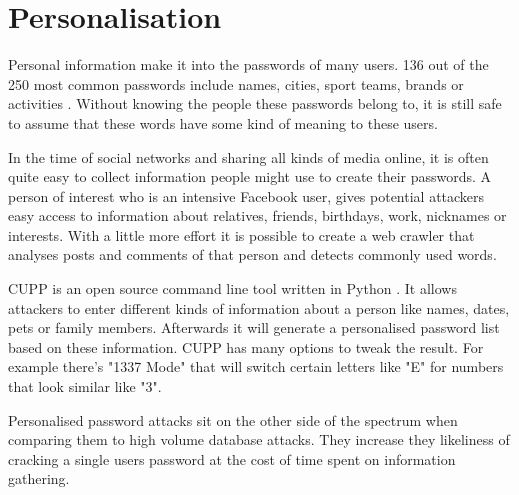 \section{Personalisation}

Personal information make it into the passwords of many users. 136 out of the 250 most common passwords include names, cities, sport teams, brands or activities \cite{seclist}. Without knowing the people these passwords belong to, it is still safe to assume that these words have some kind of meaning to these users.

In the time of social networks and sharing all kinds of media online, it is often quite easy to collect information people might use to create their passwords. A person of interest who is an intensive Facebook user, gives potential attackers easy access to information about relatives, friends, birthdays, work, nicknames or interests. With a little more effort it is possible to create a web crawler that analyses posts and comments of that person and detects commonly used words.

CUPP is an open source command line tool written in Python \cite{cupp}. It allows attackers to enter different kinds of information about a person like names, dates, pets or family members. Afterwards it will generate a personalised password list based on these information. CUPP has many options to tweak the result. For example there's "1337 Mode" that will switch certain letters like "E" for numbers that look similar like "3".

Personalised password attacks sit on the other side of the spectrum when comparing them to high volume database attacks. They increase they likeliness of cracking a single users password at the cost of time spent on information gathering.

\newpage